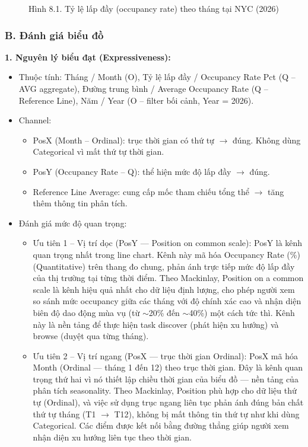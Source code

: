\begin{figure}[H]
    \centering
    \caption{Hình 8.1. Tỷ lệ lấp đầy (occupancy rate) theo tháng tại NYC (2026)}
    \label{fig:domain-task8-chart1}
\end{figure}

\subsubsection*{B. Đánh giá biểu đồ}

\textbf{1. Nguyên lý biểu đạt (Expressiveness):}

\begin{itemize}
    \item Thuộc tính: Tháng / Month (O), Tỷ lệ lấp đầy / Occupancy Rate Pct (Q -- AVG aggregate), Đường trung bình / Average Occupancy Rate (Q -- Reference Line), Năm / Year (O -- filter bối cảnh, Year = 2026).
    \item Channel:
    \begin{itemize}
        \item PosX (Month -- Ordinal): trục thời gian có thứ tự $\rightarrow$ đúng. Không dùng Categorical vì mất thứ tự thời gian.
        \item PosY (Occupancy Rate -- Q): thể hiện mức độ lấp đầy $\rightarrow$ đúng.
        \item Reference Line Average: cung cấp mốc tham chiếu tổng thể $\rightarrow$ tăng thêm thông tin phân tích.
    \end{itemize}
    \item Đánh giá mức độ quan trọng:
    \begin{itemize}
        \item Ưu tiên 1 -- Vị trí dọc (PosY --- Position on common scale): PosY là kênh quan trọng nhất trong line chart. Kênh này mã hóa Occupancy Rate (\%) (Quantitative) trên thang đo chung, phản ánh trực tiếp mức độ lấp đầy của thị trường tại từng thời điểm. Theo Mackinlay, Position on a common scale là kênh hiệu quả nhất cho dữ liệu định lượng, cho phép người xem so sánh mức occupancy giữa các tháng với độ chính xác cao và nhận diện biên độ dao động mùa vụ (từ $\sim$20\% đến $\sim$40\%) một cách tức thì. Kênh này là nền tảng để thực hiện task discover (phát hiện xu hướng) và browse (duyệt qua từng tháng).
        \item Ưu tiên 2 -- Vị trí ngang (PosX --- trục thời gian Ordinal): PosX mã hóa Month (Ordinal --- tháng 1 đến 12) theo trục thời gian. Đây là kênh quan trọng thứ hai vì nó thiết lập chiều thời gian của biểu đồ --- nền tảng của phân tích seasonality. Theo Mackinlay, Position phù hợp cho dữ liệu thứ tự (Ordinal), và việc sử dụng trục ngang liên tục phản ánh đúng bản chất thứ tự tháng (T1 $\rightarrow$ T12), không bị mất thông tin thứ tự như khi dùng Categorical. Các điểm được kết nối bằng đường thẳng giúp người xem nhận diện xu hướng liên tục theo thời gian.

\end{itemize}
\end{itemize}
